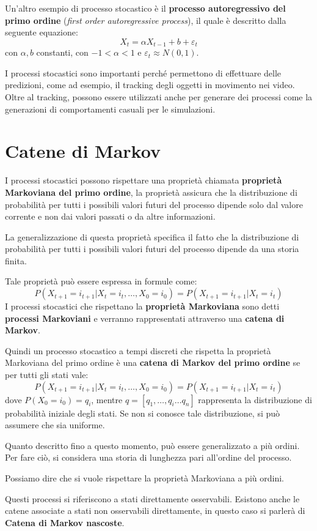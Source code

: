 Un'altro esempio di processo stocastico è il \textbf{processo autoregressivo del
    primo ordine} (\textit{first order autoregressive process}), il quale è descritto
dalla seguente equazione:
\begin{equation*}
    X_t = \alpha X_{t-1} + b + \varepsilon_t
\end{equation*}
con $\alpha,b$ constanti, con $-1<\alpha<1$ e $\varepsilon_t \approx N(0,1)$.

I processi stocastici sono importanti perché permettono di effettuare delle
predizioni, come ad esempio, il tracking degli oggetti in movimento nei video.
Oltre al tracking, possono essere utilizzati anche per generare dei processi come
la generazioni di comportamenti casuali per le simulazioni.
\section{Catene di Markov}
I processi stocastici possono rispettare una proprietà chiamata \textbf{proprietà
    Markoviana del primo ordine}, la proprietà assicura che la distribuzione di
probabilità per tutti i possibili valori futuri del processo dipende solo dal
valore corrente e non dai valori passati o da altre informazioni.

La generalizzazione di questa proprietà specifica il fatto che la distribuzione
di probabilità per tutti i possibili valori futuri del processo dipende da una
storia finita.

Tale proprietà può essere espressa in formule come:
\begin{equation}
    P(X_{t+1} = i_{t+1 } | X_t =i_t, \dots, X_{0} = i_{0})=P(X_{t+1} = i_{t+1 } | X_t =i_t)
\end{equation}
I processi stocastici che rispettano la \textbf{proprietà Markoviana} sono detti
\textbf{processi Markoviani} e verranno rappresentati attraverso una \textbf{catena di Markov}.

Quindi un processo stocastico a tempi discreti che rispetta la proprietà Markoviana
del primo ordine è una \textbf{catena di Markov del primo ordine} se per tutti
gli stati vale:
\begin{equation*}
    P(X_{t+1} = i_{t+1 } | X_t =i_t, \dots, X_{0} = i_{0}) = P(X_{t+1} = i_{t+1 } | X_t =i_t)
\end{equation*}
dove $P(X_0 = i_0) = q_i$, mentre $q = [q_1, \dots, q_i \dots q_n]$ rappresenta la
distribuzione di probabilità iniziale degli stati. Se non si conosce tale
distribuzione, si può assumere che sia uniforme.
\begin{nota}
    Quanto descritto fino a questo momento, può essere generalizzato a più ordini.
    Per fare ciò, si considera una storia di lunghezza pari all'ordine del processo.

    Possiamo dire che si vuole rispettare la proprietà Markoviana a più ordini.
\end{nota}
Questi processi si riferiscono a stati direttamente osservabili. Esistono anche
le catene associate a stati non osservabili direttamente, in questo caso si
parlerà di \textbf{Catena di Markov nascoste}.


